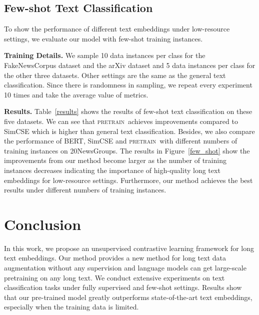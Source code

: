 \documentclass[11pt]{article}
\newcommand{\todo}[1]{{\color{red}{#1}}}
\newcommand{\our}{\mbox{\textsc{pretrain}}}
\begin{document}
\subsection{Few-shot Text Classification}
To show the performance of different text embeddings under low-resource settings, we evaluate our model with few-shot training instances.

\textbf{Training Details.} 
We sample 10 data instances per class for the FakeNewsCorpus dataset and the arXiv dataset and 5 data instances per class for the other three datasets. 
Other settings are the same as the general text classification. 
Since there is randomness in sampling, we repeat every experiment 10 times and take the average value of metrics.

\textbf{Results.} 
Table~\ref{results} shows the results of few-shot text classification on these five datasets. 
We can see that \our~achieves \todo{NUM} improvements compared to SimCSE which is higher than general text classification. 
Besides, we also compare the performance of BERT, SimCSE and \our~with different numbers of training instances on 20NewsGroups. 
The results in Figure~\ref{few_shot} show the improvements from our method become larger as the number of training instances decreases indicating the importance of high-quality long text embeddings for low-resource settings. 
Furthermore, our method achieves the best results under different numbers of training instances.



\section{Conclusion}
In this work, we propose an unsupervised contrastive learning framework for long text embeddings. 
Our method provides a new method for long text data augmentation without any supervision and language models can get large-scale pretraining on any long text. 
We conduct extensive experiments on text classification tasks under fully supervised and few-shot settings.
Results show that our pre-trained model greatly outperforms state-of-the-art text embeddings, especially when the training data is limited.



\end{document}
